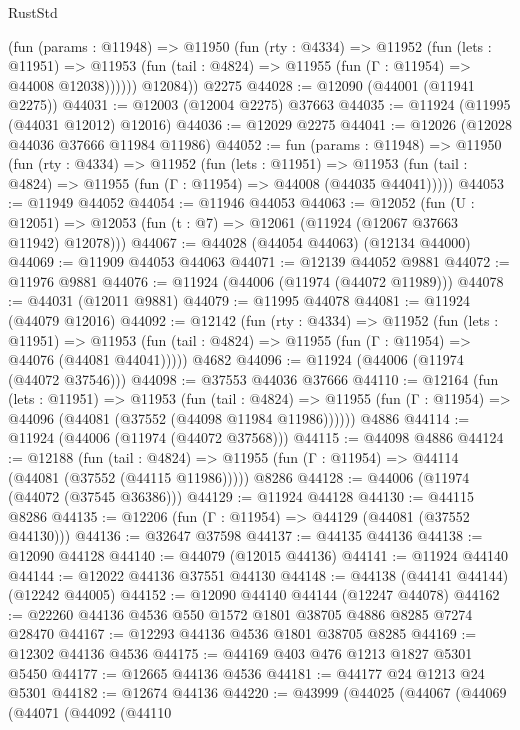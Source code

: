 \begin{lexlean}{RustStd}
\begin{coremodule}
          (fun (params : @11948) =>
          @11950
            (fun (rty : @4334) =>
            @11952
              (fun (lets : @11951) =>
              @11953 (fun (tail : @4824) => @11955 (fun (Γ : @11954) => @44008 @12038))))))
        @12084))
    @2275
@44028 := @12090 (@44001 (@11941 @2275))
@44031 := @12003 (@12004 @2275) @37663
@44035 := @11924 (@11995 (@44031 @12012) @12016)
@44036 := @12029 @2275
@44041 := @12026 (@12028 @44036 @37666 @11984 @11986)
@44052 := fun (params : @11948) =>
  @11950
    (fun (rty : @4334) =>
    @11952
      (fun (lets : @11951) =>
      @11953 (fun (tail : @4824) => @11955 (fun (Γ : @11954) => @44008 (@44035 @44041)))))
@44053 := @11949 @44052
@44054 := @11946 @44053
@44063 := @12052
    (fun (U : @12051) => @12053 (fun (t : @7) => @12061 (@11924 (@12067 @37663 @11942) @12078)))
@44067 := @44028 (@44054 @44063) (@12134 @44000)
@44069 := @11909 @44053 @44063
@44071 := @12139 @44052 @9881
@44072 := @11976 @9881
@44076 := @11924 (@44006 (@11974 (@44072 @11989)))
@44078 := @44031 (@12011 @9881)
@44079 := @11995 @44078
@44081 := @11924 (@44079 @12016)
@44092 := @12142
    (fun (rty : @4334) =>
    @11952
      (fun (lets : @11951) =>
      @11953 (fun (tail : @4824) => @11955 (fun (Γ : @11954) => @44076 (@44081 @44041)))))
    @4682
@44096 := @11924 (@44006 (@11974 (@44072 @37546)))
@44098 := @37553 @44036 @37666
@44110 := @12164
    (fun (lets : @11951) =>
    @11953
      (fun (tail : @4824) =>
      @11955 (fun (Γ : @11954) => @44096 (@44081 (@37552 (@44098 @11984 @11986))))))
    @4886
@44114 := @11924 (@44006 (@11974 (@44072 @37568)))
@44115 := @44098 @4886
@44124 := @12188
    (fun (tail : @4824) => @11955 (fun (Γ : @11954) => @44114 (@44081 (@37552 (@44115 @11986)))))
    @8286
@44128 := @44006 (@11974 (@44072 (@37545 @36386)))
@44129 := @11924 @44128
@44130 := @44115 @8286
@44135 := @12206 (fun (Γ : @11954) => @44129 (@44081 (@37552 @44130)))
@44136 := @32647 @37598
@44137 := @44135 @44136
@44138 := @12090 @44128
@44140 := @44079 (@12015 @44136)
@44141 := @11924 @44140
@44144 := @12022 @44136 @37551 @44130
@44148 := @44138 (@44141 @44144) (@12242 @44005)
@44152 := @12090 @44140 @44144 (@12247 @44078)
@44162 := @22260 @44136 @4536 @550 @1572 @1801 @38705 @4886 @8285 @7274 @28470
@44167 := @12293 @44136 @4536 @1801 @38705 @8285
@44169 := @12302 @44136 @4536
@44175 := @44169 @403 @476 @1213 @1827 @5301 @5450
@44177 := @12665 @44136 @4536
@44181 := @44177 @24 @1213 @24 @5301
@44182 := @12674 @44136
@44220 := @43999
    (@44025
      (@44067
        (@44069
          (@44071
            (@44092
              (@44110

\end{coremodule}
\end{lexlean}
